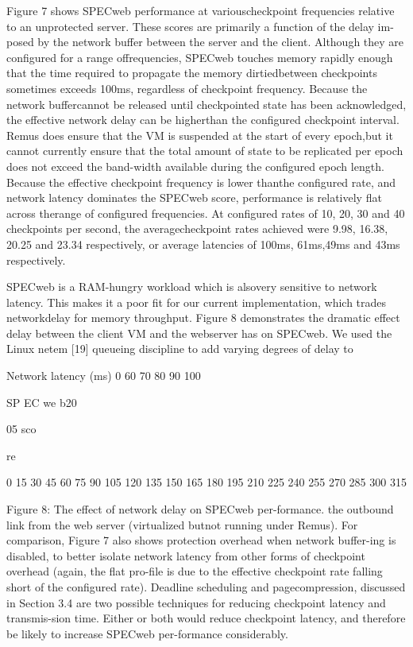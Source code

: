 Figure 7 shows SPECweb performance at variouscheckpoint frequencies relative to an unprotected server.
These scores are primarily a function of the delay im-posed by the network buffer between the server and
the client. Although they are configured for a range offrequencies, SPECweb touches memory rapidly enough
that the time required to propagate the memory dirtiedbetween checkpoints sometimes exceeds 100ms, regardless of checkpoint frequency. Because the network buffercannot be released until checkpointed state has been acknowledged, the effective network delay can be higherthan the configured checkpoint interval. Remus does ensure that the VM is suspended at the start of every epoch,but it cannot currently ensure that the total amount of
state to be replicated per epoch does not exceed the band-width available during the configured epoch length. Because the effective checkpoint frequency is lower thanthe configured rate, and network latency dominates the
SPECweb score, performance is relatively flat across therange of configured frequencies. At configured rates of
10, 20, 30 and 40 checkpoints per second, the averagecheckpoint rates achieved were 9.98, 16.38, 20.25 and
23.34 respectively, or average latencies of 100ms, 61ms,49ms and 43ms respectively.

SPECweb is a RAM-hungry workload which is alsovery sensitive to network latency. This makes it a poor
fit for our current implementation, which trades networkdelay for memory throughput. Figure 8 demonstrates the
dramatic effect delay between the client VM and the webserver has on SPECweb. We used the Linux netem [19]
queueing discipline to add varying degrees of delay to

Network latency (ms)
0 60 70 80 90 100

SP
EC
we
b20

05 
sco

re

0
15
30
45
60
75
90
105
120
135
150
165
180
195
210
225
240
255
270
285
300
315

Figure 8: The effect of network delay on SPECweb per-formance.
the outbound link from the web server (virtualized butnot running under Remus). For comparison, Figure 7
also shows protection overhead when network buffer-ing is disabled, to better isolate network latency from
other forms of checkpoint overhead (again, the flat pro-file is due to the effective checkpoint rate falling short
of the configured rate). Deadline scheduling and pagecompression, discussed in Section 3.4 are two possible
techniques for reducing checkpoint latency and transmis-sion time. Either or both would reduce checkpoint latency, and therefore be likely to increase SPECweb per-formance considerably.

